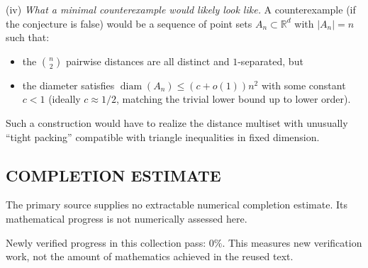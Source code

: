\noindent(iv) \emph{What a minimal counterexample would likely look like.}
A counterexample (if the conjecture is false) would be a sequence of point sets $A_n\subset\mathbb{R}^d$ with $|A_n|=n$ such that:
\begin{itemize}
\item the $\binom n2$ pairwise distances are all distinct and $1$-separated, but
\item the diameter satisfies $\operatorname{diam}(A_n) \le (c+o(1))n^2$ with some constant $c<1$ (ideally $c\approx 1/2$, matching the trivial lower bound up to lower order).
\end{itemize}
Such a construction would have to realize the distance multiset with unusually ``tight packing'' compatible with triangle inequalities in fixed dimension.


\subsection*{COMPLETION ESTIMATE}
The primary source supplies no extractable numerical completion estimate. Its mathematical progress is not numerically assessed here.

Newly verified progress in this collection pass: $0\%$. This measures new verification work, not the amount of mathematics achieved in the reused text.
